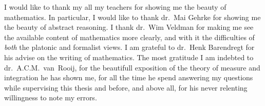 \documentclass[main.tex]{subfiles}
\begin{document}
I would like to thank my all my teachers
for showing me the beauty of mathematics.
In particular, I would like to thank
dr.~Mai Gehrke for showing me the beauty of abstract reasoning.
I thank dr.~Wim Veldman for making me
see the available content of mathematics more clearly,
and with it the difficulties
of \emph{both} the platonic and formalist views.
I am grateful to dr.~Henk Barendregt
for his advise on the writing of mathematics.
The most gratitude I am indebted
to dr.~A.C.M.~van~Rooij,
for the beautifull exposition of 
the theory of measure and integration
he has shown me,
for all the time he spend 
answering my questions
while supervising this thesis and before,
and above all,
for his never relenting willingness
to note my errors.

\clearpage
\tableofcontents
\clearpage
\end{document}

